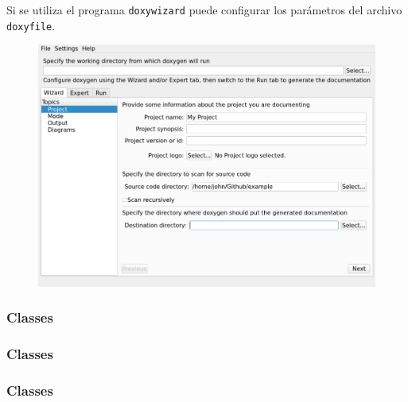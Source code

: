 \begin{frame}
	Si se utiliza el programa \lstinline{doxywizard} puede configurar los parámetros del archivo \lstinline{doxyfile}.

	\begin{figure}[ht!]
	\centering
	\includegraphics[scale=0.2]{wizard_capture.png}
	\end{figure}

\end{frame}

\begin{frame}[fragile]
	\frametitle{Classes}

	
\end{frame}

\begin{frame}[fragile]
	\frametitle{Classes}

	

\end{frame}

\begin{frame}[fragile]
	\frametitle{Classes}

	

\end{frame}

